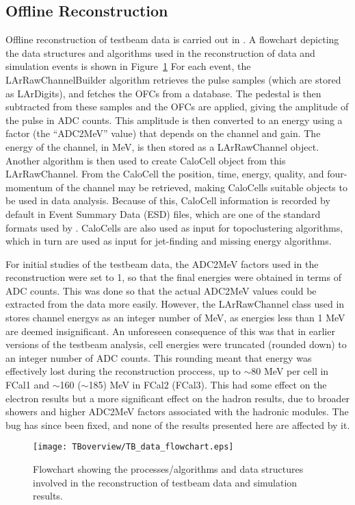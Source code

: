 \subsection{Offline Reconstruction}
\label{TBoverview_offline}
Offline reconstruction of testbeam data is carried out in \athena. A flowchart depicting the data structures and algorithms used in the reconstruction of data and simulation events is shown in Figure~\ref{TB_data_flowchart} For each event, the LArRawChannelBuilder algorithm retrieves the pulse samples (which are stored as LArDigits), and fetches the OFCs from a database. The pedestal is then subtracted from these samples and the OFCs are applied, giving the amplitude of the pulse in ADC counts. This amplitude is then converted to an energy using a factor (the ``ADC2MeV'' value) that depends on the channel and gain. The energy of the channel, in MeV, is then stored as a LArRawChannel object. Another algorithm is then used to create  CaloCell object from this LArRawChannel. From the CaloCell the position, time, energy, quality, and four-momentum of the channel may be retrieved, making CaloCells suitable objects to be used in data analysis. Because of this, CaloCell information is recorded by default in Event Summary Data (ESD) files, which are one of the standard formats used by \atlas. CaloCells are also used as input for topoclustering algorithms, which in turn are used as input for jet-finding and missing energy algorithms.

For initial studies of the testbeam data, the ADC2MeV factors used in the reconstruction were set to 1, so that the final energies were obtained in terms of ADC counts. This was done so that the actual ADC2MeV values could be extracted from the data more easily. However, the LArRawChannel class used in \athena stores channel energys as an integer number of MeV, as energies less than 1 MeV are deemed insignificant. An unforeseen consequence of this was that in earlier versions of the testbeam analysis, cell energies were truncated (rounded down) to an integer number of ADC counts. This rounding meant that energy was effectively lost during the reconstruction proccess, up to $\sim$80 MeV per cell in FCal1 and $\sim$160 ($\sim$185) MeV in FCal2 (FCal3). This had some effect on the electron results but a more significant effect on the hadron results, due to broader showers and higher ADC2MeV factors associated with the hadronic modules. The bug has since been fixed, and none of the results presented here are affected by it.


\begin{figure}[h]
\begin{center}
\texttt{[image: TBoverview/TB\_data\_flowchart.eps]}
\end{center}

\caption{Flowchart showing the processes/algorithms and data structures involved in the reconstruction of testbeam data and simulation results.}
\label{TB_data_flowchart}
\end{figure}

